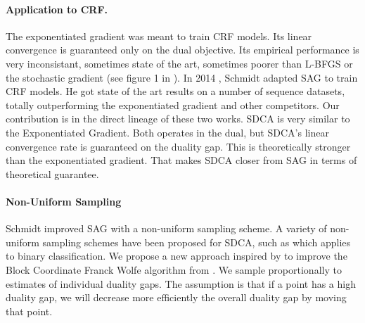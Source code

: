 \documentclass{article}
\DeclareMathOperator{\1}{\mathbb{1}}
\begin{document}
\paragraph{Application to CRF.}
The exponentiated gradient was meant to train CRF models.
Its linear convergence is guaranteed only on the dual objective.
Its empirical performance is very inconsistant, sometimes state of the art, sometimes poorer than L-BFGS or the stochastic gradient (see figure 1 in \cite{schmidt_non-uniform_2015}). 
In 2014 \cite{schmidt_non-uniform_2015}, Schmidt adapted SAG to train CRF models.
He got state of the art results on a number of sequence datasets, totally outperforming the exponentiated gradient and other competitors.
Our contribution is in the direct lineage of these two works.
SDCA is very similar to the Exponentiated Gradient.
Both operates in the dual, but SDCA's linear convergence rate is  guaranteed on the duality gap.
This is theoretically stronger than the exponentiated gradient.
That makes SDCA closer from SAG in terms of theoretical guarantee.

\paragraph{Non-Uniform Sampling}
Schmidt improved SAG with a non-uniform sampling scheme.
A variety of non-uniform sampling schemes have been proposed for SDCA, such as \cite{csiba_stochastic_2015} which applies to binary classification.
We propose a new approach inspired by \cite{osokin_minding_2016} to improve the Block Coordinate Franck Wolfe algorithm from \cite{lacoste-julien_block-coordinate_2012}.
We sample proportionally to estimates of individual duality gaps.
The assumption is that if a point has a high duality gap, we will decrease more efficiently  the overall duality gap by moving that point. 
\end{document}
